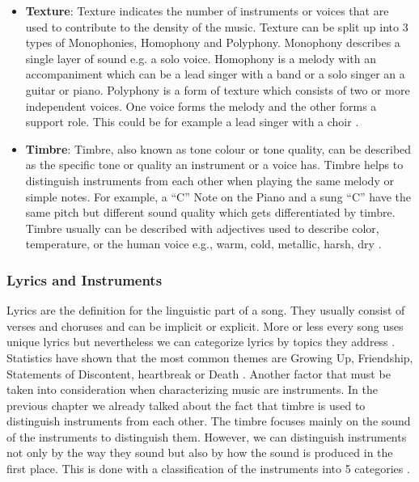 \begin{itemize}
    \item \textbf{Texture}: Texture indicates the number of instruments or voices that are used
    to contribute to the density of the music. Texture can be split up into 3 types of Monophonies,
    Homophony and Polyphony.
    Monophony describes a single layer of sound e.g. a solo voice.
    Homophony is a melody with an accompaniment which can be a lead singer with a band or a solo
    singer an a guitar or piano.
    Polyphony is a form of texture which consists of two or more independent voices.
    One voice forms the melody and the other forms a support role.
    This could be for example a lead singer with a choir \cite{2019ShawMusic}. 

    \item \textbf{Timbre}: Timbre, also known as tone colour or tone quality,
    can be described as the specific tone or quality an instrument or a voice has.
    Timbre helps to distinguish instruments from each other when playing the same melody or simple notes.
    For example, a “C” Note on the Piano and a sung “C” have the same pitch but different sound
    quality which gets differentiated by timbre.
    Timbre usually can be described with adjectives used to describe color, temperature,
    or the human voice e.g., warm, cold, metallic, harsh, dry \cite[94]{Hemming2015}.

\end{itemize}

\subsubsection{Lyrics and Instruments}

Lyrics are the definition for the linguistic part of a song.
They usually consist of verses and choruses and can be implicit or explicit.
More or less every song uses unique lyrics but nevertheless we can categorize lyrics by topics they address \cite{Shipman2014Analysis}.
Statistics have shown that the most common themes are Growing Up, Friendship, Statements of Discontent,
heartbreak or Death \cite{2020AIMMListening}.
Another factor that must be taken into consideration when characterizing music are instruments.
In the previous chapter we already talked about the fact that timbre is used to distinguish instruments
from each other.
The timbre focuses mainly on the sound of the instruments to distinguish them.
However, we can distinguish instruments not only by the way they sound but also by how the sound is produced
in the first place.
This is done with a classification of the instruments into 5 categories \cite{GoshenInstrumentClass}.


